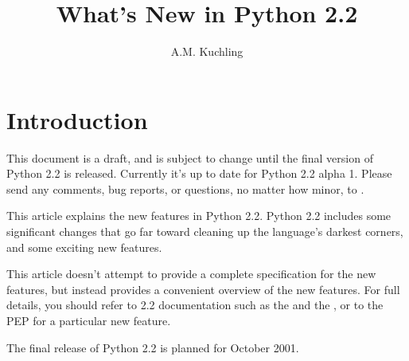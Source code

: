 \documentclass{howto}
\title{What's New in Python 2.2}
\author{A.M. Kuchling}
\begin{document}
\maketitle\tableofcontents

\section{Introduction}

{\large This document is a draft, and is subject to change until the
final version of Python 2.2 is released.  Currently it's up to date
for Python 2.2 alpha 1.  Please send any comments, bug reports, or
questions, no matter how minor, to .
}

This article explains the new features in Python 2.2.  Python 2.2
includes some significant changes that go far toward cleaning up the
language's darkest corners, and some exciting new features.

This article doesn't attempt to provide a complete specification for
the new features, but instead provides a convenient overview of the
new features.  For full details, you should refer to 2.2 documentation
such as the
 and the
, or to the PEP for a particular new feature.

The final release of Python 2.2 is planned for October 2001.







\end{document}
